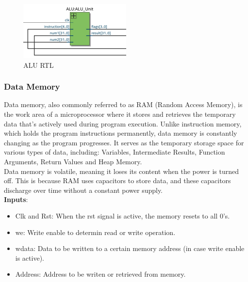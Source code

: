 \documentclass[9pt,a4paper,twoside]{tau}
\begin{document}
    \begin{figure}[h]  %
        \centering  %
        \includegraphics[width=0.5\textwidth]{images/ALUImg.png}
        \caption{ALU RTL}
        \label{fig:ALU RTL}
    \end{figure}


\subsubsection{Data Memory}
    Data memory, also commonly referred to as RAM (Random Access Memory), is the work area of a microprocessor where it stores and retrieves the temporary data that's actively used during program execution. Unlike instruction memory, which holds the program instructions permanently, data memory is constantly changing as the program progresses. It serves as the temporary storage space for various types of data, including:
    Variables, Intermediate Results, Function Arguments, Return Values and Heap Memory.\\
    Data memory is volatile, meaning it loses its content when the power is turned off. This is because RAM uses capacitors to store data, and these capacitors discharge over time without a constant power supply.\\

    \textbf{Inputs}:
    \begin{itemize}
        \item Clk and Rst: When the rst signal is active, the memory resets to all 0's.
        \item we: Write enable to determin read or write operation.
        \item wdata: Data to be written to a certain memory address (in case write enable is active).
        \item Address: Address to be writen or retrieved from memory.
    \end{itemize}
    
\end{document}

